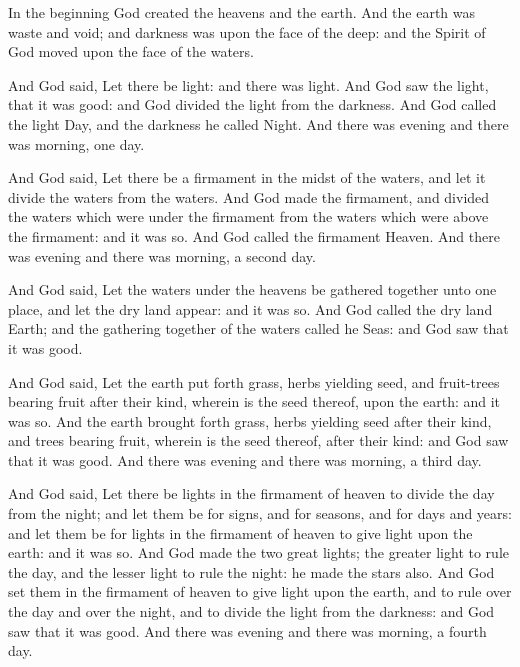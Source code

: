 


In the beginning God created the heavens and the earth. And the earth was waste and void; and darkness was upon the face of the deep: and the Spirit of God moved upon the face of the waters. 

And God said, Let there be light: and there was light. And God saw the light, that it was good: and God divided the light from the darkness. And God called the light Day, and the darkness he called Night. And there was evening and there was morning, one day.  

And God said, Let there be a firmament in the midst of the waters, and let it divide the waters from the waters. And God made the firmament, and divided the waters which were under the firmament from the waters which were above the firmament: and it was so. And God called the firmament Heaven. And there was evening and there was morning, a second day.  

And God said, Let the waters under the heavens be gathered together unto one place, and let the dry land appear: and it was so. And God called the dry land Earth; and the gathering together of the waters called he Seas: and God saw that it was good. 

And God said, Let the earth put forth grass, herbs yielding seed, and fruit-trees bearing fruit after their kind, wherein is the seed thereof, upon the earth: and it was so. And the earth brought forth grass, herbs yielding seed after their kind, and trees bearing fruit, wherein is the seed thereof, after their kind: and God saw that it was good. And there was evening and there was morning, a third day.  

And God said, Let there be lights in the firmament of heaven to divide the day from the night; and let them be for signs, and for seasons, and for days and years: and let them be for lights in the firmament of heaven to give light upon the earth: and it was so. And God made the two great lights; the greater light to rule the day, and the lesser light to rule the night: he made the stars also. And God set them in the firmament of heaven to give light upon the earth, and to rule over the day and over the night, and to divide the light from the darkness: and God saw that it was good. And there was evening and there was morning, a fourth day.  

